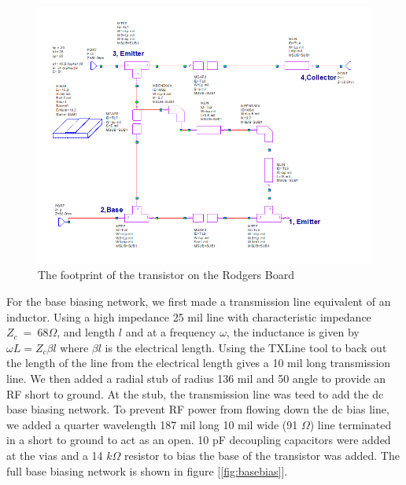 \documentclass{article}
\begin{document}
\begin{figure}[!htbp]
    \centering
    \includegraphics[scale=0.4]{transistor_footprint.png}
    \caption{The footprint of the transistor on the Rodgers Board}
    \label{fig:footprint}
\end{figure}

For the base biasing network, we first made a transmission line equivalent of an inductor. Using a high impedance 25 mil line with characteristic impedance $Z_c\ =\ 68\Omega$, and length $l$ and at a frequency $\omega$, the inductance is given by $\omega L = Z_c \beta l$ where $\beta l$ is the electrical length. Using the TXLine tool to back out the length of the line from the electrical length gives a 10 mil long transmission line. We then added a radial stub of radius 136 mil and 50 \textdegree angle to provide an RF short to ground. At the stub, the transmission line was teed to add the dc base biasing network. To prevent RF power from flowing down the dc bias line, we added a quarter wavelength 187 mil long 10 mil wide (91 $\Omega$) line terminated in a short to ground to act as an open. 10 pF decoupling capacitors were added at the vias and a 14 $k\Omega$ resistor to bias the base of the transistor was added. The full base biasing network is shown in figure [\ref{fig:basebias}].
\end{document}
